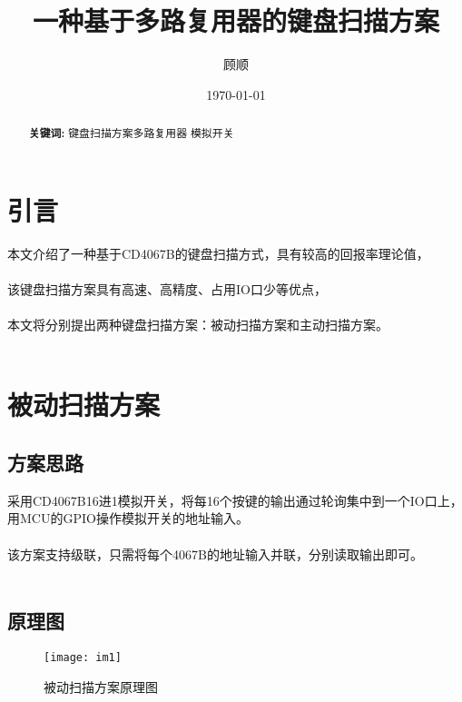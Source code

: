 \documentclass[UTF8]{ctexart}
\title{\heiti 一种基于多路复用器的键盘扫描方案}
\author{\kaishu 顾顺}
\date{\today}
\begin{document}
	\maketitle

	\newpage

	\tableofcontents
	
	\begin{abstract}
		\textbf{关键词: }键盘扫描方案\space 多路复用器 \space 模拟开关
	\end{abstract}

	\newpage

	\section{引言}
	\indent 本文介绍了一种基于CD4067B的键盘扫描方式，具有较高的回报率理论值，\\\\
	\indent 该键盘扫描方案具有高速、高精度、占用IO口少等优点，\\\\
	\indent 本文将分别提出两种键盘扫描方案：被动扫描方案和主动扫描方案。\\\\
	
	\newpage
	
	\section{被动扫描方案}
	\subsection{方案思路}
		\indent 采用CD4067B\space 16进1模拟开关，将每16个按键的输出通过轮询集中到一个IO口上，用MCU的GPIO操作模拟开关的地址输入。 \\\\
		\indent 该方案支持级联，只需将每个4067B的地址输入并联，分别读取输出即可。 \\\\
	
	\subsection{原理图}
		\begin{figure}[htbp]
			\centering 
			\texttt{[image: im1]}
			\caption{被动扫描方案原理图}
		\end{figure}
	
\end{document}
